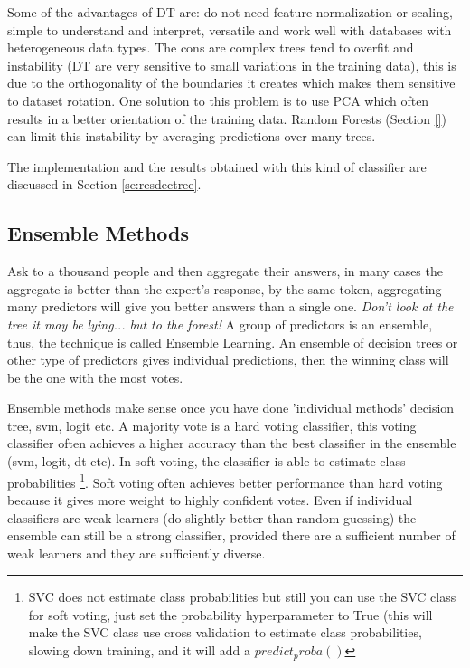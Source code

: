 \documentclass[11pt]{article}
\begin{document}
Some of the advantages of DT are: do not need feature normalization or scaling, simple to understand and interpret, versatile and work well with databases with heterogeneous data types. The cons are complex trees tend to overfit and instability (DT are very sensitive to small variations in the training data), this is due to the orthogonality of the boundaries it creates which makes them sensitive to dataset rotation. One solution to this problem is to use PCA which often results in a better orientation of the training data. Random Forests (Section \ref{}) can limit this instability by averaging predictions over many trees.

The implementation and the results obtained with this kind of classifier are discussed in Section \ref{se:resdectree}.

\subsection{Ensemble Methods}
\label{sse:ensemble}
Ask to a thousand people and then aggregate their answers, in many cases the aggregate is better than the expert's response, by the same token, aggregating many predictors will give you better answers than a single one.
\emph{Don't look at the tree it may be lying... but to the forest!}
A group of predictors is an ensemble, thus, the technique is called Ensemble Learning. An ensemble of decision trees or other type of predictors gives individual predictions, then the winning class will be the one with the most votes. 

Ensemble methods make sense once you have done 'individual methods' decision tree, svm, logit etc. A majority vote is a hard voting classifier, this voting classifier often achieves a higher accuracy than the best classifier in the ensemble (svm, logit, dt etc). In soft voting, the classifier is able to estimate class probabilities \footnote{SVC does not estimate class probabilities but still you can use the SVC class for soft voting, just set the probability hyperparameter to True (this will make the SVC class use cross validation to estimate class probabilities, slowing down training, and it will add a $predict_proba()$}. Soft voting often achieves better performance than hard voting because it gives more weight to highly confident votes.
Even if individual classifiers are weak learners (do slightly better than random guessing) the ensemble can still be a strong classifier, provided there are a sufficient number of weak learners and they are sufficiently diverse. %
\end{document}
